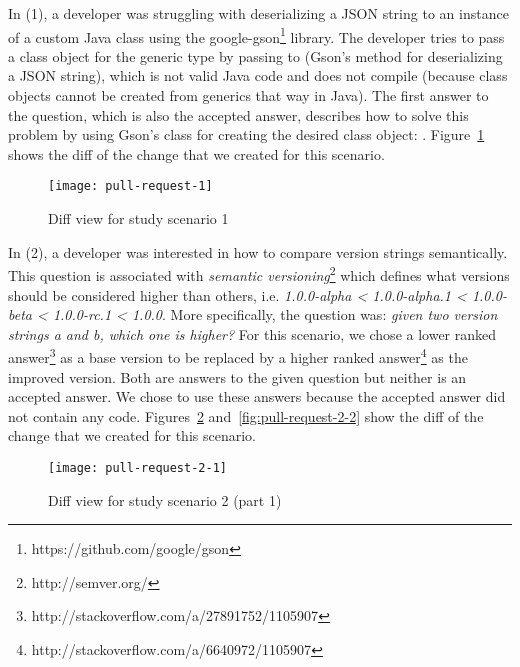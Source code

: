 \documentclass[../manifest.tex]{subfiles}
\begin{document}
In (1), a developer was struggling with deserializing a JSON string to an instance of a custom Java class using the google-gson\footnote{https://github.com/google/gson} library. The developer tries to pass a class object for the generic type  by passing  to  (Gson's method for deserializing a JSON string), which is not valid Java code and does not compile (because class objects cannot be created from generics that way in Java). The first answer to the question, which is also the accepted answer, describes how to solve this problem by using Gson's  class for creating the desired class object: . Figure~\ref{fig:pull-request-1} shows the diff of the change that we created for this scenario.

\begin{figure}[h]
  \centering
  \texttt{[image: pull-request-1]}
  \caption{Diff view for study scenario 1}
  \label{fig:pull-request-1}
\end{figure}

In (2), a developer was interested in how to compare version strings semantically. This question is associated with \textit{semantic versioning}\footnote{http://semver.org/} which defines what versions should be considered higher than others, i.e. \textit{1.0.0-alpha < 1.0.0-alpha.1 < 1.0.0-beta < 1.0.0-rc.1 < 1.0.0}. More specifically, the question was: \textit{given two version strings a and b, which one is higher?} For this scenario, we chose a lower ranked answer\footnote{http://stackoverflow.com/a/27891752/1105907} as a base version to be replaced by a higher ranked answer\footnote{http://stackoverflow.com/a/6640972/1105907} as the improved version. Both are answers to the given question but neither is an accepted answer. We chose to use these answers because the accepted answer did not contain any code. Figures~\ref{fig:pull-request-2-1} and~\ref{fig:pull-request-2-2} show the diff of the change that we created for this scenario.


\begin{figure}[h]
  \centering
  \texttt{[image: pull-request-2-1]}
  \caption{Diff view for study scenario 2 (part 1)}
  \label{fig:pull-request-2-1}
\end{figure}
\end{document}
